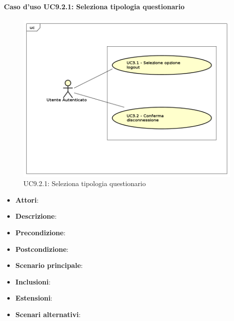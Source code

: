 		\paragraph{Caso d'uso UC9.2.1: Seleziona tipologia questionario}
		\label{UC9.2.1}
		\begin{figure}[h]
			\centering
		\includegraphics[scale=0.7,keepaspectratio]{UML/UC9.png}
			\caption{UC9.2.1: Seleziona tipologia questionario}
		\end{figure}
		\FloatBarrier
		\begin{itemize}
			\item \textbf{Attori}: 
			\item \textbf{Descrizione}: 
			\item \textbf{Precondizione}: 
			\item \textbf{Postcondizione}: 
			\item \textbf{Scenario principale}:
			\item \textbf{Inclusioni}:
			\item \textbf{Estensioni}:
			\item \textbf{Scenari alternativi}:
		\end{itemize}
		
